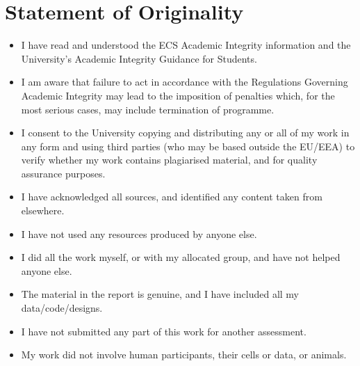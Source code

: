 \chapter*{Statement of Originality}
\begin{itemize}
	\item I have read and understood the ECS Academic Integrity information and the University’s
	Academic Integrity Guidance for Students.
	\item I am aware that failure to act in accordance with the Regulations Governing Academic Integrity
	may lead to the imposition of penalties which, for the most serious cases, may include
	termination of programme.
	\item I consent to the University copying and distributing any or all of my work in any form and
	using third parties (who may be based outside the EU/EEA) to verify whether my work
	contains plagiarised material, and for quality assurance purposes.

	\item I have acknowledged all sources, and identified any content taken from elsewhere.
	\item I have not used any resources produced by anyone else.
	\item I did all the work myself, or with my allocated group, and have not helped anyone else.
	\item The material in the report is genuine, and I have included all my data/code/designs.
	\item I have not submitted any part of this work for another assessment.
	\item My work did not involve human participants, their cells or data, or animals.

\end{itemize}